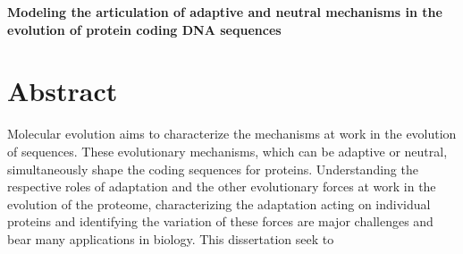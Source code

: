 \thispagestyle{empty}
\begin{center}
	\LARGE
	\textbf{Modeling the articulation of adaptive and neutral mechanisms in the evolution of protein coding DNA sequences}
\end{center}
\setlength{\parskip}{0.5em}

\section*{Abstract}
Molecular evolution aims to characterize the mechanisms at work in the evolution of sequences.
These evolutionary mechanisms, which can be adaptive or neutral, simultaneously shape the coding sequences for proteins.
Understanding the respective roles of adaptation and the other evolutionary forces at work in the evolution of the proteome, characterizing the adaptation acting on individual proteins and identifying the variation of these forces are major challenges and bear many applications in biology.
This dissertation seek to 
